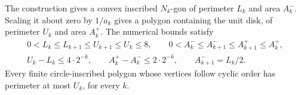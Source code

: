 \begin{theorem}
\label{lim:polygons}
The construction gives a convex inscribed $N_k$-gon of perimeter $L_k$
and area $A_k^-$. Scaling it about zero by $1/a_k$ gives a polygon
containing the unit disk, of perimeter $U_k$ and area $A_k^+$.
The numerical bounds satisfy
\begin{gather*}
 0<L_k\le L_{k+1}\le U_{k+1}\le U_k\le8,\qquad
 0<A_k^-\le A_{k+1}^-\le A_{k+1}^+\le A_k^+,\\
 U_k-L_k\le4\cdot2^{-k},\qquad
 A_k^+-A_k^-\le2\cdot2^{-k},\qquad
 A_{k+1}^-=L_k/2.                                      \tag{L2}
\end{gather*}
Every finite circle-inscribed polygon whose vertices follow cyclic order
has perimeter at most $U_k$, for every $k$.
\end{theorem}
